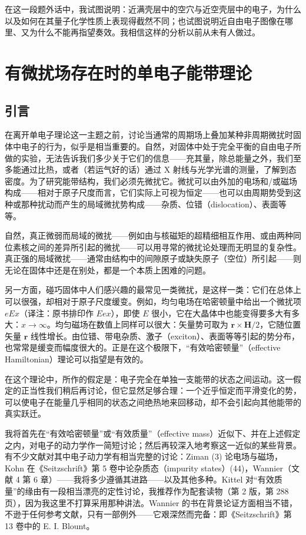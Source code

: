 在这一段题外话中，我试图说明：近满壳层中的空穴与近空壳层中的电子，为什么以及如何在其量子化学性质上表现得截然不同；也试图说明近自由电子图像在哪里、又为什么不能再指望奏效。我相信这样的分析以前从未有人做过。

\section{有微扰场存在时的单电子能带理论}

\subsection{引言}

在离开单电子理论这一主题之前，讨论当通常的周期场上叠加某种非周期微扰时固体中电子的行为，似乎是相当重要的。自然，对固体中处于完全平衡的自由电子所做的实验，无法告诉我们多少关于它们的信息——充其量，除总能量之外，我们至多能通过比热，或者（若运气好的话）通过 X 射线与光学光谱的测量，了解到态密度。为了研究能带结构，我们必须先微扰它。微扰可以由外加的电场和/或磁场构成——相对于原子尺度而言，它们实际上可视为恒定——也可以由周期势受到这种或那种扰动而产生的局域微扰势构成——杂质、位错（dislocation）、表面等等。

自然，真正微弱而局域的微扰——例如由与核磁矩的超精细相互作用、或由两种同位素核之间的差异所引起的微扰——可以用寻常的微扰论处理而无明显的复杂性。真正强的局域微扰——通常由结构中的间隙原子或缺失原子（空位）所引起——则无论在固体中还是在别处，都是一个本质上困难的问题。


另一方面，碰巧固体中人们感兴趣的最常见一类微扰，是这样一类：它们在总体上可以很强，却相对于原子尺度缓变。例如，均匀电场在哈密顿量中给出一个微扰项 $eEx$（译注：原书排印作 $Eex$），即使 $E$ 很小，它在大晶体中也能变得要多大有多大：$x \to \infty$。均匀磁场在数值上同样可以很大：矢量势可取为 $\mathbf{r} \times \mathbf{H}/2$，它随位置矢量 $\mathbf{r}$ 线性增长。由位错、带电杂质、激子（exciton）、表面等等引起的势分布，也常常是缓变而幅度很大的。正是在这个极限下，“有效哈密顿量”（effective Hamiltonian）理论可以指望是有效的。

在这个理论中，所作的假定是：电子完全在单独一支能带的状态之间运动。这一假定的正当性我们稍后再讨论，但它显然足够合理：一个近乎恒定而平滑变化的势，可以使电子在能量几乎相同的状态之间绝热地来回移动，却不会引起向其他能带的真实跃迁。

我将首先在“有效哈密顿量”或“有效质量”（effective mass）近似下、并在上述假定之内，对电子的动力学作一简短讨论；然后再较深入地考察这一近似的某些背景。有不少文献对其中电子动力学有相当完整的讨论：Ziman (3) 论电场与磁场，Kohn 在《Seitzschrift》第 5 卷中论杂质态（impurity states）(44)，Wannier（文献 4 第 6 章）——我将多少遵循其进路——以及其他多种。Kittel 对“有效质量”的缘由有一段相当漂亮的定性讨论，我推荐作为配套读物（第 2 版，第 288 页），因为我这里不打算采用那种讲法。Wannier 的书在背景论证方面相当不错，不逊于任何参考文献，只有一部例外——它艰深然而完备：即《Seitzschrift》第 13 卷中的 E. I. Blount。

